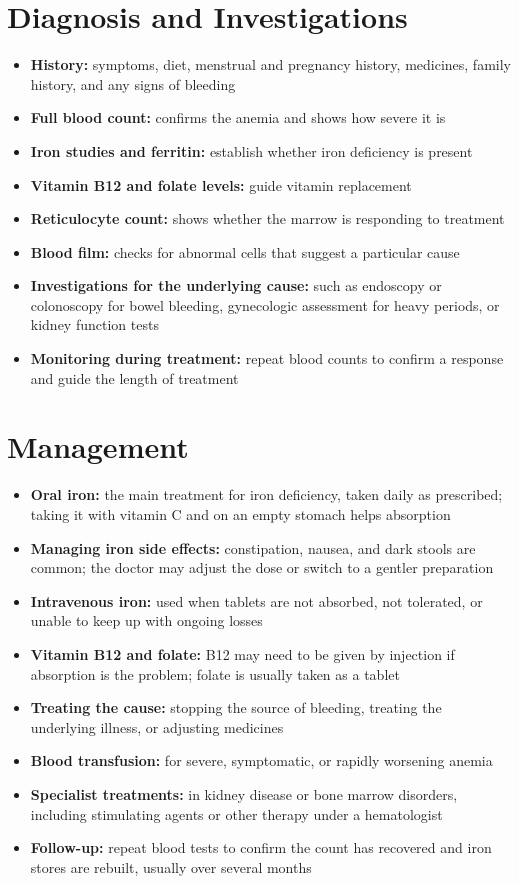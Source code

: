 \section*{Diagnosis and Investigations}
\begin{itemize}
    \item \textbf{History:} symptoms, diet, menstrual and pregnancy history, medicines, family history, and any signs of bleeding
    \item \textbf{Full blood count:} confirms the anemia and shows how severe it is
    \item \textbf{Iron studies and ferritin:} establish whether iron deficiency is present
    \item \textbf{Vitamin B12 and folate levels:} guide vitamin replacement
    \item \textbf{Reticulocyte count:} shows whether the marrow is responding to treatment
    \item \textbf{Blood film:} checks for abnormal cells that suggest a particular cause
    \item \textbf{Investigations for the underlying cause:} such as endoscopy or colonoscopy for bowel bleeding, gynecologic assessment for heavy periods, or kidney function tests
    \item \textbf{Monitoring during treatment:} repeat blood counts to confirm a response and guide the length of treatment
\end{itemize}

\section*{Management}
\begin{itemize}
    \item \textbf{Oral iron:} the main treatment for iron deficiency, taken daily as prescribed; taking it with vitamin C and on an empty stomach helps absorption
    \item \textbf{Managing iron side effects:} constipation, nausea, and dark stools are common; the doctor may adjust the dose or switch to a gentler preparation
    \item \textbf{Intravenous iron:} used when tablets are not absorbed, not tolerated, or unable to keep up with ongoing losses
    \item \textbf{Vitamin B12 and folate:} B12 may need to be given by injection if absorption is the problem; folate is usually taken as a tablet
    \item \textbf{Treating the cause:} stopping the source of bleeding, treating the underlying illness, or adjusting medicines
    \item \textbf{Blood transfusion:} for severe, symptomatic, or rapidly worsening anemia
    \item \textbf{Specialist treatments:} in kidney disease or bone marrow disorders, including stimulating agents or other therapy under a hematologist
    \item \textbf{Follow-up:} repeat blood tests to confirm the count has recovered and iron stores are rebuilt, usually over several months
\end{itemize}


